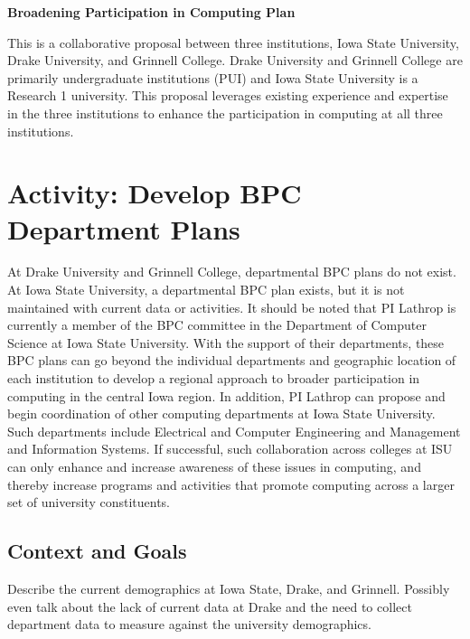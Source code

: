 \documentclass[11pt]{article}
\begin{document}
    \setcounter{page}{1}
    \begin{center}
        {\Large {\bf Broadening Participation in Computing Plan}}
    \end{center}

	This is a collaborative proposal between three institutions, Iowa State University, Drake University, and Grinnell College.  Drake University and Grinnell College are primarily undergraduate institutions (PUI) and Iowa State University is a Research 1 university.  This proposal leverages existing experience and expertise in the three institutions to enhance the participation in computing at all three institutions.


    \section{Activity: Develop BPC Department Plans}
    
    At Drake University and Grinnell College, departmental BPC plans do not exist.  At Iowa State University, a departmental BPC plan exists, but it is not maintained with current data or activities.  It should be noted that PI Lathrop is currently a member of the BPC committee in the Department of Computer Science at Iowa State University.  With the support of their departments, these BPC plans can go beyond the individual departments and geographic location of each institution to develop a regional approach to broader participation in computing in the central Iowa region.  In addition, PI Lathrop can propose and begin coordination of other computing departments at Iowa State University.  Such departments include Electrical and Computer Engineering and Management and Information Systems.  If successful, such collaboration across colleges at ISU can only enhance and  increase awareness of these issues in computing, and thereby increase programs and activities that promote computing across a larger set of university constituents. 

    \subsection{Context and Goals}
    Describe the current demographics at Iowa State, Drake, and Grinnell.
    Possibly even talk about the lack of current data at Drake and the need to collect department data to measure against the university demographics.
\end{document}

